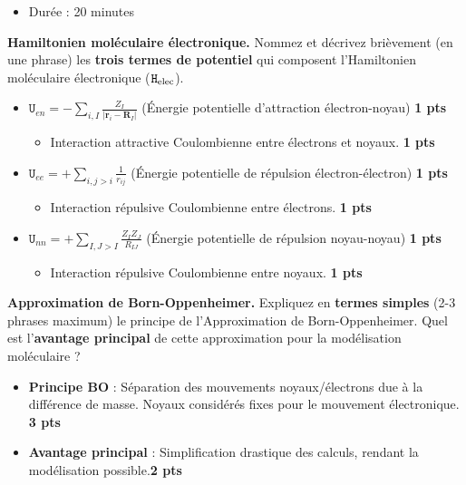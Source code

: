 \documentclass[a4paper,answers]{exam} %
\newcommand{\pts}[1]{\textbf{#1 pts}}
\begin{document}
\begin{itemize}
    \item Durée : 20 minutes
\end{itemize}

\vspace{0.2cm}

\begin{questions}

\question[6] \textbf{Hamiltonien moléculaire électronique.} Nommez et décrivez brièvement (en une phrase) les \textbf{trois termes de potentiel} qui composent l'Hamiltonien moléculaire électronique ($\mathtt{H}_{\rm elec}$).

\begin{solution}
\begin{itemize}
    \item $\mathtt{U}_{en}= - \sum_{i,I}\frac{Z_I}{|\mathbf{r}_i-\mathbf{R}_I|}$ (Énergie potentielle d'attraction électron-noyau) \hfill \pts{1}
        \begin{itemize}
            \item Interaction attractive Coulombienne entre électrons et noyaux. \hfill \pts{1}
        \end{itemize}
    \item $\mathtt{U}_{ee}=+\sum_{i,j>i}\frac{1}{r_{ij}}$ (Énergie potentielle de répulsion électron-électron) \hfill \pts{1}
        \begin{itemize}
            \item Interaction répulsive Coulombienne entre électrons. \hfill \pts{1}
        \end{itemize}
    \item $\mathtt{U}_{nn}=+\sum_{I,J>I}\frac{Z_IZ_J}{R_{IJ}}$ (Énergie potentielle de répulsion noyau-noyau) \hfill \pts{1}
        \begin{itemize}
            \item Interaction répulsive Coulombienne entre noyaux.  \hfill \pts{1}
        \end{itemize}
\end{itemize}
\end{solution}

\question[5] \textbf{Approximation de Born-Oppenheimer.} Expliquez en \textbf{termes simples} (2-3 phrases maximum) le principe de l'Approximation de Born-Oppenheimer. Quel est l'\textbf{avantage principal} de cette approximation pour la modélisation moléculaire ?

\begin{solution}
\begin{itemize}
    \item \textbf{Principe BO} : Séparation des mouvements noyaux/électrons due à la différence de masse. Noyaux considérés fixes pour le mouvement électronique. \hfill \pts{3}
    \item \textbf{Avantage principal} : Simplification drastique des calculs, rendant la modélisation possible.\hfill\pts{2}
\end{itemize}
\end{solution}


\end{questions}
\end{document}
